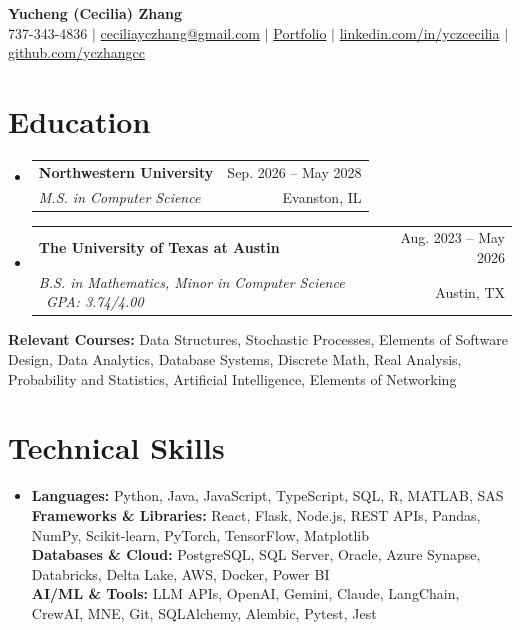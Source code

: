 \documentclass[letterpaper,10pt]{article}
\makeatletter
\newcommand{\resumeSubheading}[4]{
  \vspace{-2pt}\item
    \begin{tabular*}{0.985\textwidth}[t]{l@{\extracolsep{\fill}}r}
      \textbf{#1} & \small #2 \\
      \textit{\small #3} & \small #4 \\
    \end{tabular*}\vspace{-4pt}
}
\newcommand{\resumeSubHeadingListStart}{\begin{itemize}[leftmargin=0.11in,label={}]}
\newcommand{\resumeSubHeadingListEnd}{\end{itemize}\vspace{-2pt}}
\makeatother
\begin{document}
\begin{center}
{\Large\textbf{Yucheng (Cecilia) Zhang}}\\[-1pt]
\small 737-343-4836 $|$ \href{mailto:ceciliayczhang@gmail.com}{ceciliayczhang@gmail.com} $|$
\href{https://yczhangcc.github.io/yuchengzhang_portfolio/}{Portfolio} $|$
\href{https://www.linkedin.com/in/yczcecilia/}{linkedin.com/in/yczcecilia} $|$
\href{https://github.com/yczhangcc}{github.com/yczhangcc}
\end{center}
\vspace{-8pt}

\section{Education}
\resumeSubHeadingListStart
\resumeSubheading{Northwestern University}{Sep. 2026 -- May 2028}{M.S. in Computer Science}{Evanston, IL}
\resumeSubheading{The University of Texas at Austin}{Aug. 2023 -- May 2026}{B.S. in Mathematics, Minor in Computer Science \textbar\ GPA: 3.74/4.00}{Austin, TX}
\resumeSubHeadingListEnd
\vspace{-3pt}
\footnotesize{\textbf{Relevant Courses:} Data Structures, Stochastic Processes, Elements of Software Design, Data Analytics, Database Systems, Discrete Math, Real Analysis, Probability and Statistics, Artificial Intelligence, Elements of Networking}
\vspace{-4pt}

\section{Technical Skills}
\begin{itemize}[leftmargin=0.11in,label={},topsep=1pt,itemsep=0pt]
\footnotesize\item{
\textbf{Languages:} Python, Java, JavaScript, TypeScript, SQL, R, MATLAB, SAS \\
\textbf{Frameworks \& Libraries:} React, Flask, Node.js, REST APIs, Pandas, NumPy, Scikit-learn, PyTorch, TensorFlow, Matplotlib \\
\textbf{Databases \& Cloud:} PostgreSQL, SQL Server, Oracle, Azure Synapse, Databricks, Delta Lake, AWS, Docker, Power BI \\
\textbf{AI/ML \& Tools:} LLM APIs, OpenAI, Gemini, Claude, LangChain, CrewAI, MNE, Git, SQLAlchemy, Alembic, Pytest, Jest
}
\end{itemize}
\vspace{-7pt}
\end{document}
